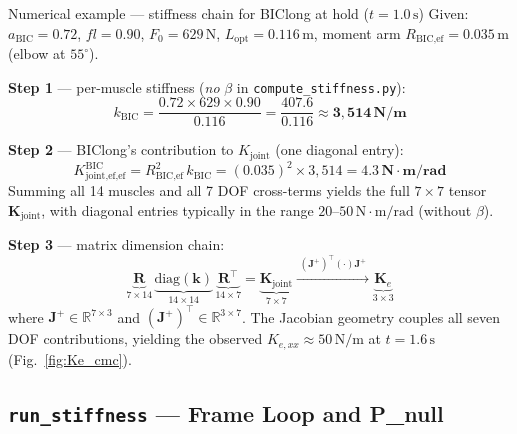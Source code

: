 \documentclass[11pt,a4paper]{article}
\newcommand{\file}[1]{\texttt{\color{PipePurple}#1}}
\newcommand{\R}{\mathbb{R}}
\newcommand{\bR}{\bm{R}}
\newcommand{\bK}{\bm{K}}
\newcommand{\bJ}{\bm{J}}
\begin{document}
\begin{notebox}[PipeBlue]{Numerical example --- stiffness chain for BIClong at hold ($t=1.0\,\text{s}$)}
Given: $a_\text{BIC}=0.72$, $fl=0.90$, $F_0=629\,\text{N}$, $L_\text{opt}=0.116\,\text{m}$,
moment arm $R_\text{BIC,ef}=0.035\,\text{m}$ (elbow at $55^\circ$).

\textbf{Step 1} --- per-muscle stiffness (\emph{no} $\beta$ in \file{compute\_stiffness.py}):
\[
k_\text{BIC} = \frac{0.72\times629\times0.90}{0.116}
             = \frac{407.6}{0.116} \approx \mathbf{3{,}514\,\text{N/m}}
\]

\textbf{Step 2} --- BIClong's contribution to $K_\text{joint}$ (one diagonal entry):
\[
K_{\text{joint},\text{ef,ef}}^{\text{BIC}}
= R_{\text{BIC,ef}}^2\,k_\text{BIC}
= (0.035)^2\times3{,}514 = \mathbf{4.3\,\text{N}{\cdot}\text{m/rad}}
\]
Summing all 14 muscles and all 7 DOF cross-terms yields the full $7\times7$ tensor
$\bK_\text{joint}$, with diagonal entries typically in the range $20\text{--}50\,\text{N}{\cdot}\text{m/rad}$
(without $\beta$).

\textbf{Step 3} --- matrix dimension chain:
\[
\underbrace{\bR}_{7\times14}\,
\underbrace{\mathrm{diag}(\bm{k})}_{14\times14}\,
\underbrace{\bR^\top}_{14\times7}
= \underbrace{\bK_\text{joint}}_{7\times7}
\xrightarrow{\;(\bJ^+)^\top(\cdot)\bJ^+\;}
\underbrace{\bm{K}_e}_{3\times3}
\]
where $\bJ^+\in\R^{7\times3}$ and $(\bJ^+)^\top\in\R^{3\times7}$.
The Jacobian geometry couples all seven DOF contributions, yielding the
observed $K_{e,xx}\approx50\,\text{N/m}$ at $t=1.6\,\text{s}$ (Fig.~\ref{fig:Ke_cmc}).
\end{notebox}

\subsection{\texttt{run\_stiffness} — Frame Loop and P\_null}
\end{document}
